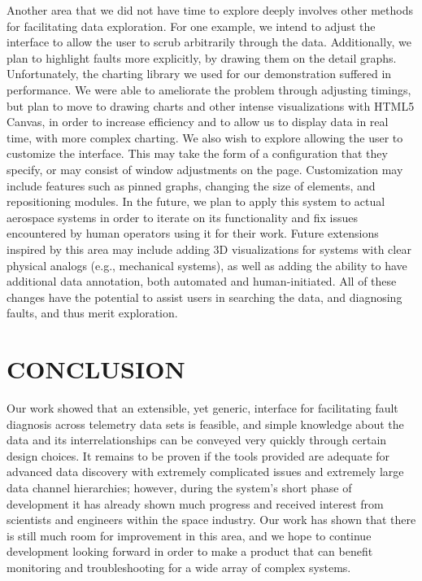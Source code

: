 \documentclass[letterpaper, 10 pt, conference]{ieeeconf}  %
\begin{document}
Another area that we did not have time to explore deeply involves other methods for facilitating data exploration. For one example, we intend to adjust the interface to allow the user to scrub arbitrarily through the data. Additionally, we plan to highlight faults more explicitly, by drawing them on the detail graphs. Unfortunately, the charting library we used for our demonstration suffered in performance. We were able to ameliorate the problem through adjusting timings, but plan to move to drawing charts and other intense visualizations with HTML5 Canvas, in order to increase efficiency and to allow us to display data in real time, with more complex charting. We also wish to explore allowing the user to customize the interface. This may take the form of a configuration that they specify, or may consist of window adjustments on the page. Customization may include features such as pinned graphs, changing the size of elements, and repositioning modules. In the future, we plan to apply this system to actual aerospace systems in order to iterate on its functionality and fix issues encountered by human operators using it for their work. Future extensions inspired by this area may include adding 3D visualizations for systems with clear physical analogs (e.g., mechanical systems), as well as adding the ability to have additional data annotation, both automated and human-initiated. All of these changes have the potential to assist users in searching the data, and diagnosing faults, and thus merit exploration.

\section{CONCLUSION}

Our work showed that an extensible, yet generic, interface for facilitating fault diagnosis across telemetry data sets is feasible, and simple knowledge about the data and its interrelationships can be conveyed very quickly through certain design choices. It remains to be proven if the tools provided are adequate for advanced data discovery with extremely complicated issues and extremely large data channel hierarchies; however, during the system's short phase of development it has already shown much progress and received interest from scientists and engineers within the space industry. Our work has shown that there is still much room for improvement in this area, and we hope to continue development looking forward in order to make a product that can benefit monitoring and troubleshooting for a wide array of complex systems.
\end{document}
